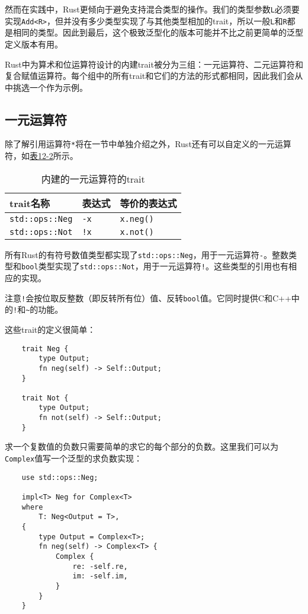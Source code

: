 然而在实践中，Rust更倾向于避免支持混合类型的操作。我们的类型参数\texttt{L}必须要实现\texttt{Add<R>}，但并没有多少类型实现了与其他类型相加的trait，所以一般\texttt{L}和\texttt{R}都是相同的类型。因此到最后，这个极致泛型化的版本可能并不比之前更简单的泛型定义版本有用。

Rust中为算术和位运算符设计的内建trait被分为三组：一元运算符、二元运算符和复合赋值运算符。每个组中的所有trait和它们的方法的形式都相同，因此我们会从中挑选一个作为示例。

\subsection{一元运算符}\label{unop}
除了解引用运算符\texttt{*}将在一节中单独介绍之外，Rust还有可以自定义的一元运算符，如\hyperref[t12-2]{表12-2}所示。

\begin{table}[htbp]
    \centering
    \caption{内建的一元运算符的trait}
    \label{t12-2}
    \begin{tabular}{p{}p{}p{}}
        \hline
        \textbf{trait名称}  & \textbf{表达式}   & \textbf{等价的表达式} \\
        \hline
        \texttt{std::ops::Neg}  & \texttt{-x}   & \texttt{x.neg()}  \\
        \rowcolor{tablecolor}
        \texttt{std::ops::Not}  & \texttt{!x}   & \texttt{x.not()}  \\
    \end{tabular}
\end{table}

所有Rust的有符号数值类型都实现了\texttt{std::ops::Neg}，用于一元运算符\texttt{-}。整数类型和\texttt{bool}类型实现了\texttt{std::ops::Not}，用于一元运算符\texttt{!}。这些类型的引用也有相应的实现。

注意\texttt{!}会按位取反整数（即反转所有位）值、反转\texttt{bool}值。它同时提供C和C++中的\texttt{!}和\texttt{\~{}}的功能。

这些trait的定义很简单：
\begin{verbatim}
    trait Neg {
        type Output;
        fn neg(self) -> Self::Output;
    }

    trait Not {
        type Output;
        fn not(self) -> Self::Output;
    }
\end{verbatim}

求一个复数值的负数只需要简单的求它的每个部分的负数。这里我们可以为\texttt{Complex}值写一个泛型的求负数实现：
\begin{verbatim}
    use std::ops::Neg;

    impl<T> Neg for Complex<T>
    where
        T: Neg<Output = T>,
    {
        type Output = Complex<T>;
        fn neg(self) -> Complex<T> {
            Complex {
                re: -self.re,
                im: -self.im,
            }
        }
    }
\end{verbatim}

